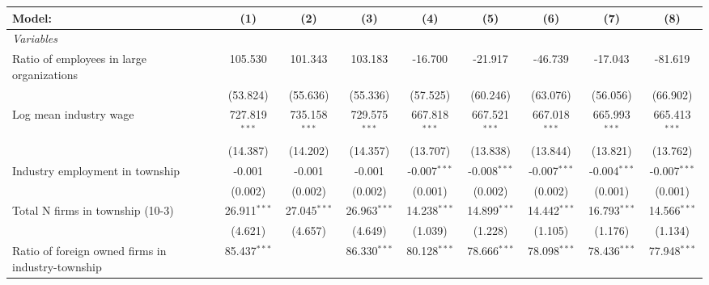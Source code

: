 \begingroup
\centering
\begin{tabular}{lcccccccc}
   \tabularnewline \midrule \midrule
   Model:                                                & (1)             & (2)             & (3)             & (4)              & (5)              & (6)              & (7)              & (8)\\  
   \midrule
   \emph{Variables}\\
   Ratio of employees in large organizations             & 105.530         & 101.343         & 103.183         & -16.700          & -21.917          & -46.739          & -17.043          & -81.619\\   
                                                         & (53.824)        & (55.636)        & (55.336)        & (57.525)         & (60.246)         & (63.076)         & (56.056)         & (66.902)\\   
   Log mean industry wage                                & 727.819$^{***}$ & 735.158$^{***}$ & 729.575$^{***}$ & 667.818$^{***}$  & 667.521$^{***}$  & 667.018$^{***}$  & 665.993$^{***}$  & 665.413$^{***}$\\   
                                                         & (14.387)        & (14.202)        & (14.357)        & (13.707)         & (13.838)         & (13.844)         & (13.821)         & (13.762)\\   
   Industry employment in township                       & -0.001          & -0.001          & -0.001          & -0.007$^{***}$   & -0.008$^{***}$   & -0.007$^{***}$   & -0.004$^{***}$   & -0.007$^{***}$\\   
                                                         & (0.002)         & (0.002)         & (0.002)         & (0.001)          & (0.002)          & (0.002)          & (0.001)          & (0.001)\\   
   Total N firms in township (10-3)                      & 26.911$^{***}$  & 27.045$^{***}$  & 26.963$^{***}$  & 14.238$^{***}$   & 14.899$^{***}$   & 14.442$^{***}$   & 16.793$^{***}$   & 14.566$^{***}$\\   
                                                         & (4.621)         & (4.657)         & (4.649)         & (1.039)          & (1.228)          & (1.105)          & (1.176)          & (1.134)\\   
   Ratio of foreign owned firms in industry-township     & 85.437$^{***}$  &                 & 86.330$^{***}$  & 80.128$^{***}$   & 78.666$^{***}$   & 78.098$^{***}$   & 78.436$^{***}$   & 77.948$^{***}$\\   

\end{tabular}

